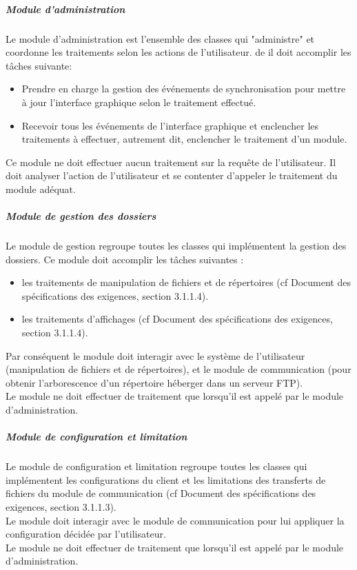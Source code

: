 \documentclass[10pt,a4paper]{report}
\begin{document}
				\subparagraph{Module d'administration}
				
				\begin{flushleft}
				Le module d'administration est l'ensemble des classes qui "administre" et coordonne les traitements selon les actions de l'utilisateur. de  il doit accomplir les tâches suivante:
				
				\begin{itemize}
					\item Prendre en charge la gestion des événements de synchronisation pour mettre à jour l'interface graphique selon le traitement effectué. 
					\item Recevoir tous les événements de l'interface graphique et enclencher les traitements à effectuer, autrement dit, enclencher le traitement d'un module.
				\end{itemize}
				
Ce module ne doit effectuer aucun traitement sur la requête de l'utilisateur. Il doit analyser l'action de l'utilisateur et se contenter d'appeler le traitement du module adéquat.
				\end{flushleft}
				
	
				\subparagraph{Module de gestion des dossiers}
				\begin{flushleft}
				Le module de gestion regroupe toutes les classes qui implémentent la gestion des dossiers. Ce module doit accomplir les tâches suivantes :
				\begin{itemize}
					\item les traitements de manipulation de fichiers et de répertoires (cf Document des spécifications des exigences, section 3.1.1.4).
					\item les traitements d'affichages (cf Document des spécifications des exigences, section 3.1.1.4).
				\end{itemize}
				
				Par conséquent le module doit interagir avec le système de l'utilisateur (manipulation de fichiers et de répertoires), et le module de communication (pour obtenir l'arborescence d'un répertoire héberger dans un serveur FTP).\\
				Le module ne doit effectuer de traitement que lorsqu'il est appelé par le module d'administration.
				\end{flushleft}
	
				\subparagraph{Module de configuration et limitation}	
				\begin{flushleft}
				Le module de configuration et limitation regroupe toutes les classes qui implémentent les configurations du client et les limitations des transferts de fichiers du module de communication (cf Document des spécifications des exigences, section 3.1.1.3).\\
				Le module doit interagir avec le module de communication pour lui appliquer la configuration décidée par l'utilisateur.\\
				Le module ne doit effectuer de traitement que lorsqu'il est appelé par le module d'administration.
				\end{flushleft}
	
\end{document}
